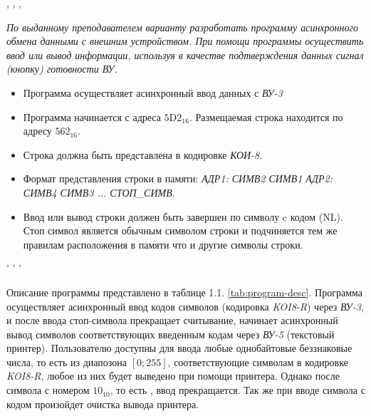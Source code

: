\tableofcontents


\newpage
\Chapter{\lab\ \labnumber}{\labtheme}{}

\begin{center}
, , ,
\end{center}
\noindent

\textit{По выданному преподавателем варианту разработать программу асинхронного обмена данными с внешним устройством. При помощи программы осуществить ввод или вывод информации, используя в качестве подтверждения данных сигнал (кнопку) готовности ВУ.}
\begin{itemize}
    \item Программа осуществляет асинхронный ввод данных с \textit{ВУ-3}
    \item Программа начинается с адреса $\mathrm{5D2}_{16}$. Размещаемая строка находится по адресу $562_{16}$.
    \item Строка должна быть представлена в кодировке \textit{КОИ-8}.
    \item Формат представления строки в памяти: \textit{АДР1: СИМВ2 СИМВ1 АДР2: СИМВ4 СИМВ3 ... СТОП\_СИМВ}.
    \item Ввод или вывод строки должен быть завершен по символу c кодом  (NL). Стоп символ является обычным символом строки и подчиняется тем же правилам расположения в памяти что и другие символы строки.
\end{itemize}

\begin{center}
    ' ' '
\end{center}

\newpage
{}


Описание программы представлено в таблице 1.1. \ref{tab:program-desc}.
Программа осуществляет асинхронный ввод кодов символов (кодировка \textit{KOI8-R})  через \textit{ВУ-3}, и после ввода стоп-символа  прекращает считывание, начинает асинхронный вывод символов соответствующих введенным кодам через \textit{ВУ-5} (текстовый принтер).
Пользователю доступны для ввода любые однобайтовые беззнаковые числа, то есть из диапозона $[0;255]$, соответствующие символам в кодировке \textit{KOI8-R}, любое из них будет выведено при помощи принтера. Однако после символа с номером $10_{10}$, то есть , ввод прекращается. Так же при вводе символа с кодом  произойдет очистка вывода принтера.

